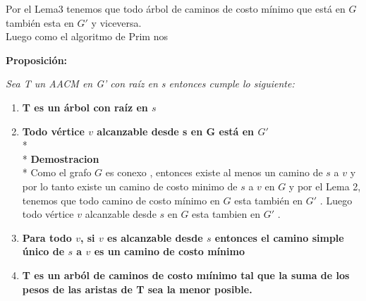\documentclass{article}
\begin{document}
    \vspace*{0.3cm} 

    \noindent  Por el Lema3 tenemos que todo \'arbol de caminos de costo m\'inimo que est\'a en $G$ tambi\'en esta en $G'$  y viceversa.\\
    Luego como el algoritmo de Prim nos
    
    \vspace*{0.5cm}
    \noindent \textbf{Proposici\'on:}
    
    \noindent \textit{Sea T un  AACM en G' con ra\'iz en s entonces cumple lo siguiente:}

    \begin{enumerate}
        \item  \textbf{T es un \'arbol con ra\'iz en $s$}
        
        \vspace*{0.3cm}

        \item \textbf{Todo v\'ertice $v$ alcanzable desde s en G est\'a en $G'$}
        \\*
        \\*
        \textbf{Demostracion } 
        \\*
        Como el grafo $G$ es conexo , entonces existe al menos un camino de $s$ a $v$ y por lo tanto existe un camino de costo minimo 
        de $s$ a $v$ en $G$ y por el Lema 2, tenemos que todo camino de costo m\'inimo en $G$ esta tambi\'en en $G'$ . Luego todo v\'ertice 
        $v$ alcanzable desde $s$ en $G$ esta tambien en $G'$ . 
        
        \vspace*{0.3cm} 

        \item \textbf{Para todo $v$, si $v$ es alcanzable desde $s$ entonces el camino simple \'unico de $s$ a $v$ es un camino de costo m\'inimo}
        \item  \textbf{T es un arb\'ol de caminos de costo mı\'inimo tal que la suma de los pesos de las aristas de T sea la menor posible.}
    \end{enumerate}
    
    

    \vspace*{0.5cm} 
\end{document}
